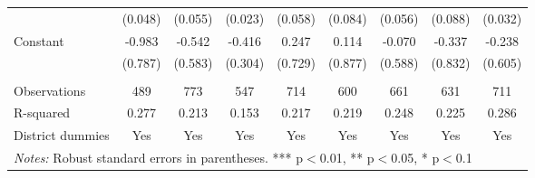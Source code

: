 \documentclass[11pt]{article}
\begin{document}
\begin{landscape}
\begin{table}[H]
{\begin{tabularx}{1.8\linewidth}{lcccccccc}
 & (0.048) & (0.055) & (0.023) & (0.058) & (0.084) & (0.056) & (0.088) & (0.032) \\
Constant & -0.983 & -0.542 & -0.416 & 0.247 & 0.114 & -0.070 & -0.337 & -0.238 \\
 & (0.787) & (0.583) & (0.304) & (0.729) & (0.877) & (0.588) & (0.832) & (0.605) \\
 &  &  &  &  &  &  &  &  \\
Observations & 489 & 773 & 547 & 714 & 600 & 661 & 631 & 711 \\
R-squared & 0.277 & 0.213 & 0.153 & 0.217 & 0.219 & 0.248 & 0.225 & 0.286 \\
 District dummies & Yes & Yes & Yes & Yes & Yes & Yes & Yes & Yes \\ \hline
\multicolumn{9}{l}{\textit{Notes:} Robust standard errors in parentheses. *** p$<$0.01, ** p$<$0.05, * p$<$0.1} \\
  \end{tabularx}}
\end{table}
\doublespacing

\end{landscape}

\newpage

\end{document}
